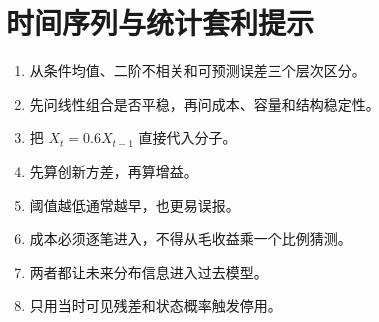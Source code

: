 \chapter{时间序列与统计套利提示}
\begin{enumerate}[leftmargin=*]
  \item 从条件均值、二阶不相关和可预测误差三个层次区分。
  \item 先问线性组合是否平稳，再问成本、容量和结构稳定性。
  \item 把 $X_t=0.6X_{t-1}$ 直接代入分子。
  \item 先算创新方差，再算增益。
  \item 阈值越低通常越早，也更易误报。
  \item 成本必须逐笔进入，不得从毛收益乘一个比例猜测。
  \item 两者都让未来分布信息进入过去模型。
  \item 只用当时可见残差和状态概率触发停用。
\end{enumerate}
